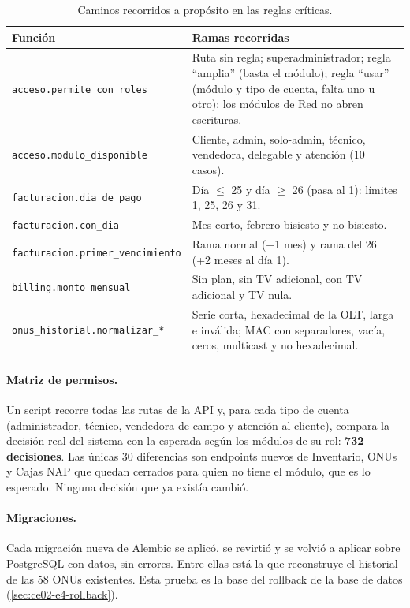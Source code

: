 \begin{table}[H]
\centering
\caption{Caminos recorridos a propósito en las reglas críticas.}
\label{tab:ce02-e4-caminos}
\small
\begin{tabularx}{\textwidth}{L{4.2cm}X}
\toprule
\textbf{Función} & \textbf{Ramas recorridas} \\
\midrule
\texttt{acceso.permite\_con\_roles} & Ruta sin regla; superadministrador; regla ``amplia'' (basta el módulo); regla ``usar'' (módulo y tipo de cuenta, falta uno u otro); los módulos de Red no abren escrituras. \\
\texttt{acceso.modulo\_disponible} & Cliente, admin, solo-admin, técnico, vendedora, delegable y atención (10 casos). \\
\texttt{facturacion.dia\_de\_pago} & Día $\le$ 25 y día $\ge$ 26 (pasa al 1): límites 1, 25, 26 y 31. \\
\texttt{facturacion.con\_dia} & Mes corto, febrero bisiesto y no bisiesto. \\
\texttt{facturacion.primer\_vencimiento} & Rama normal (+1 mes) y rama del 26 (+2 meses al día 1). \\
\texttt{billing.monto\_mensual} & Sin plan, sin TV adicional, con TV adicional y TV nula. \\
\texttt{onus\_historial.normalizar\_*} & Serie corta, hexadecimal de la OLT, larga e inválida; MAC con separadores, vacía, ceros, multicast y no hexadecimal. \\
\bottomrule
\end{tabularx}
\end{table}

\paragraph{Matriz de permisos.} Un script recorre todas las rutas de la API y, para cada tipo
de cuenta (administrador, técnico, vendedora de campo y atención al cliente), compara la
decisión real del sistema con la esperada según los módulos de su rol: \textbf{732
decisiones}. Las únicas 30 diferencias son endpoints nuevos de Inventario, ONUs y Cajas NAP que
quedan cerrados para quien no tiene el módulo, que es lo esperado. Ninguna decisión que ya
existía cambió.

\paragraph{Migraciones.} Cada migración nueva de Alembic se aplicó, se revirtió y se volvió a
aplicar sobre PostgreSQL con datos, sin errores. Entre ellas está la que reconstruye el
historial de las 58 ONUs existentes. Esta prueba es la base del rollback de la base de datos
(\cref{sec:ce02-e4-rollback}).

